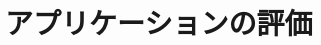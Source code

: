 \documentclass[main]{subfiles}
\begin{document}
\chapter{アプリケーションの評価}
\label{cha:validation}
\end{document}

